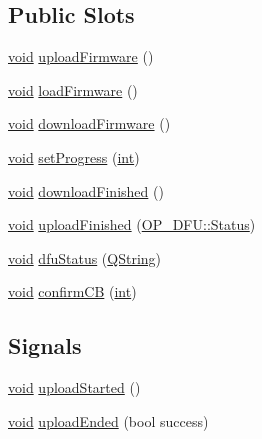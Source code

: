 \subsection*{Public Slots}
\begin{DoxyCompactItemize}
\item 
\hyperlink{group___u_a_v_objects_plugin_ga444cf2ff3f0ecbe028adce838d373f5c}{void} \hyperlink{group___uploader_ga51b53782cd70711b9ca91f81ef02565b}{upload\-Firmware} ()
\item 
\hyperlink{group___u_a_v_objects_plugin_ga444cf2ff3f0ecbe028adce838d373f5c}{void} \hyperlink{group___y_modem_uploader_gafbf692fdd482b85feb6510193a242a87}{load\-Firmware} ()
\item 
\hyperlink{group___u_a_v_objects_plugin_ga444cf2ff3f0ecbe028adce838d373f5c}{void} \hyperlink{group___uploader_ga988f01d143265ee96b4255b07b63fbf6}{download\-Firmware} ()
\item 
\hyperlink{group___u_a_v_objects_plugin_ga444cf2ff3f0ecbe028adce838d373f5c}{void} \hyperlink{group___uploader_ga8ac75c9483f273ed59faa116fe5699ee}{set\-Progress} (\hyperlink{ioapi_8h_a787fa3cf048117ba7123753c1e74fcd6}{int})
\item 
\hyperlink{group___u_a_v_objects_plugin_ga444cf2ff3f0ecbe028adce838d373f5c}{void} \hyperlink{group___uploader_ga0809fb3c0a799a12c92704a36d3abf16}{download\-Finished} ()
\item 
\hyperlink{group___u_a_v_objects_plugin_ga444cf2ff3f0ecbe028adce838d373f5c}{void} \hyperlink{group___uploader_ga671fb25fd918e7eeac5c16bd1f1dfe86}{upload\-Finished} (\hyperlink{class_o_p___d_f_u_a83b075feaf572fe76e597acea58c8eda}{O\-P\-\_\-\-D\-F\-U\-::\-Status})
\item 
\hyperlink{group___u_a_v_objects_plugin_ga444cf2ff3f0ecbe028adce838d373f5c}{void} \hyperlink{group___uploader_gac421d53cac355c47f763a62eab7675c1}{dfu\-Status} (\hyperlink{group___u_a_v_objects_plugin_gab9d252f49c333c94a72f97ce3105a32d}{Q\-String})
\item 
\hyperlink{group___u_a_v_objects_plugin_ga444cf2ff3f0ecbe028adce838d373f5c}{void} \hyperlink{group___y_modem_uploader_ga116ecb3aed92f7f793ea4769a7e0572d}{confirm\-C\-B} (\hyperlink{ioapi_8h_a787fa3cf048117ba7123753c1e74fcd6}{int})
\end{DoxyCompactItemize}
\subsection*{Signals}
\begin{DoxyCompactItemize}
\item 
\hyperlink{group___u_a_v_objects_plugin_ga444cf2ff3f0ecbe028adce838d373f5c}{void} \hyperlink{group___y_modem_uploader_ga237b72fb1450126236fb690941ce7cf0}{upload\-Started} ()
\item 
\hyperlink{group___u_a_v_objects_plugin_ga444cf2ff3f0ecbe028adce838d373f5c}{void} \hyperlink{group___y_modem_uploader_ga80c1daefa8adc8af10178e3ad8c52307}{upload\-Ended} (bool success)
\end{DoxyCompactItemize}
